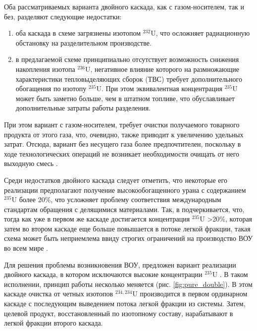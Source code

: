 Оба рассматриваемых варианта двойного каскада, как с газом-носителем, так и без, разделяют следующие недостатки:
\begin{enumerate}
  \item оба каскада в схеме загрязнены изотопом $^{232}$U, что осложняет радиационную обстановку на разделительном производстве.
  \item в предлагаемой схеме принципиально отсутствует возможность снижения накопления изотопа $^{236}$U, негативное влияние которого на размножающие характеристики тепловыделяющих сборок (ТВС) требует дополнительного обогащения по изотопу $^{235}$U. При этом эквивалентная концентрация $^{235}$U может быть заметно больше, чем в штатном топливе, что обуславливает дополнительные затраты работы разделения.
\end{enumerate}

При этом вариант с газом-носителем, требует очистки получаемого товарного продукта от этого газа, что, очевидно, также приводит к увеличению удельных затрат. Отсюда, вариант без несущего газа более предпочтителен, поскольку в ходе технологических операций не возникает необходимости очищать от него выходную смесь \cite{smirnovKaskadnyeShemyZadachah2012}.

Среди недостатков двойного каскада следует отметить, что некоторые его реализации предполагают получение высокообогащенного урана с содержанием $^{235}$U более 20\%, что усложняет проблему соответствия международным стандартам обращения с делящимися материалами.
Так, в \cite{palkinPurificationReprocessedUranium2016} подчеркивается, что, тогда как уже в первом же каскаде достигается концентрация $^{235}$U >20\%, которая затем во втором каскаде еще больше повышается в потоке легкой фракции, такая схема может быть неприемлема ввиду строгих ограничений на производство ВОУ во всем мире \cite{ManagementHighEnriched2005}.

Для решения проблемы возникновения ВОУ, предложен вариант реализации двойного каскада, в котором исключаются высокие концентрации $^{235}$U \cite{zhurinSposobIzotopnogoVosstanovleniya2010}. В таком исполнении, принцип работы несколько меняется (рис. \ref{fig:pure_double}).
В этом каскаде очистка от четных изотопов $^{234,234}$U производится в первом ординарном каскаде с последующим выведением потока легкой фракции из системы. Затем, целевой продукт, восстановленный по изотопному составу, нарабатывают в легкой фракции второго каскада.


